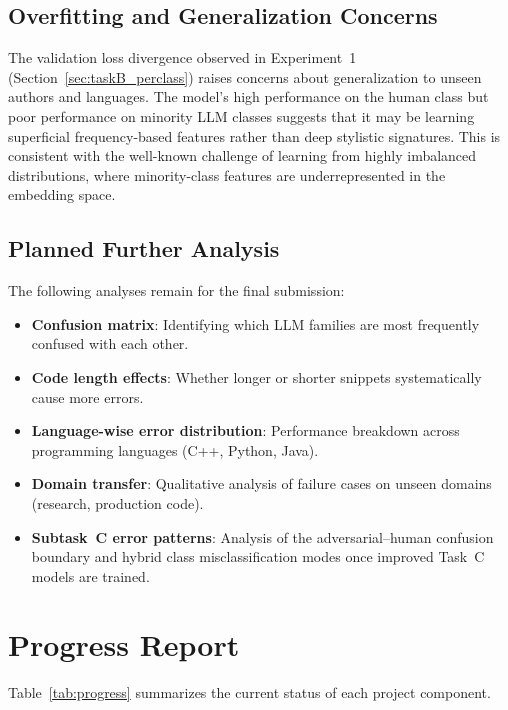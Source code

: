 \documentclass[11pt]{article}
\begin{document}
\subsection{Overfitting and Generalization Concerns}

The validation loss divergence observed in Experiment~1 (Section~\ref{sec:taskB_perclass}) raises concerns about generalization to unseen authors and languages. The model's high performance on the human class but poor performance on minority LLM classes suggests that it may be learning superficial frequency-based features rather than deep stylistic signatures. This is consistent with the well-known challenge of learning from highly imbalanced distributions, where minority-class features are underrepresented in the embedding space.

\subsection{Planned Further Analysis}

The following analyses remain for the final submission:
\begin{itemize}
    \item \textbf{Confusion matrix}: Identifying which LLM families are most frequently confused with each other.
    \item \textbf{Code length effects}: Whether longer or shorter snippets systematically cause more errors.
    \item \textbf{Language-wise error distribution}: Performance breakdown across programming languages (C++, Python, Java).
    \item \textbf{Domain transfer}: Qualitative analysis of failure cases on unseen domains (research, production code).
    \item \textbf{Subtask~C error patterns}: Analysis of the adversarial--human confusion boundary and hybrid class misclassification modes once improved Task~C models are trained.
\end{itemize}

\section{Progress Report}
\label{sec:progress}

Table~\ref{tab:progress} summarizes the current status of each project component.
\end{document}
